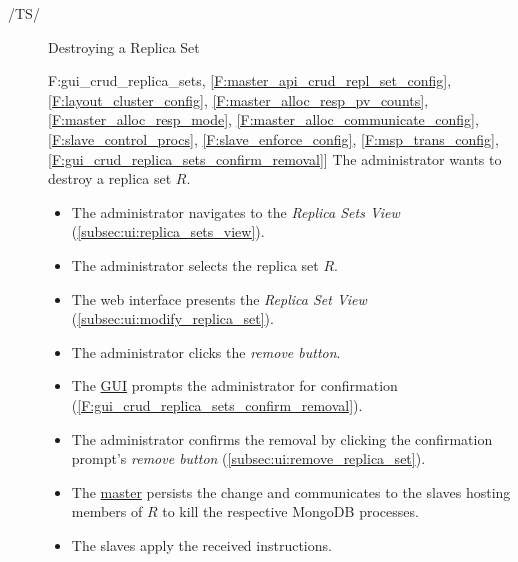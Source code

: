 \documentclass[a4paper, 11pt]{article}
\makeatletter
\def\namedlabel#1#2{\begingroup
    #2%
    \def\@currentlabel{#2}%
    \phantomsection\label{#1}\endgroup
}
\newcommand{\oitem}[2]{
  \@ifundefined{c@oitem#1}{\newcounter{oitem#1}}{} %
  \addtocounter{oitem#1}{10}
  \item[\namedlabel{#1:#2}{/#1\arabic{oitem#1}/}]
}
\newcommand{\testsequence}[3][]{
	\begin{description}[leftmargin=!,labelwidth=\widthof{\bfseries Preconditions}]
		\ifthenelse{\equal{#1}{}}
		{} %
		{\item[Tests] #1}
		\item[Preconditions] #2
		\item[Steps] #3
	\end{description}
}
\makeatother
\begin{document}
\begin{description}
\oitem{TS}{} Destroying a Replica Set
\testsequence
[\ref{F:gui_crud_replica_sets}, \ref{F:master_api_crud_repl_set_config}, \ref{F:layout_cluster_config}, \ref{F:master_alloc_resp_pv_counts}, \ref{F:master_alloc_resp_mode}, \ref{F:master_alloc_communicate_config}, \ref{F:slave_control_procs}, \ref{F:slave_enforce_config}, \ref{F:msp_trans_config}, \ref{F:gui_crud_replica_sets_confirm_removal}]
{
	The \gls{administrator} wants to destroy a \gls{replica set} $R$.
}
{
	\begin{itemize}
		\item The \gls{administrator} navigates to the \textit{Replica Sets View} (\ref{subsec:ui:replica_sets_view}).
		\item The \gls{administrator} selects the replica set $R$.
		\item The web interface presents the \textit{Replica Set View} (\ref{subsec:ui:modify_replica_set}).
		\item The \gls{administrator} clicks the \textit{remove button}.
		\item The \hyperref[SM:GUI]{GUI} prompts the \gls{administrator} for confirmation (\ref{F:gui_crud_replica_sets_confirm_removal}).
		\item The \gls{administrator} confirms the removal by clicking the confirmation prompt's \textit{remove button} (\ref{subsec:ui:remove_replica_set}).
		\item The \hyperref[SM:Master]{master} persists the change and communicates to the \glspl{slave} hosting members of $R$ to kill the respective \gls{MongoDB} processes.
		\item The \glspl{slave} apply the received instructions.
	\end{itemize}
}


\end{description}
\end{document}
